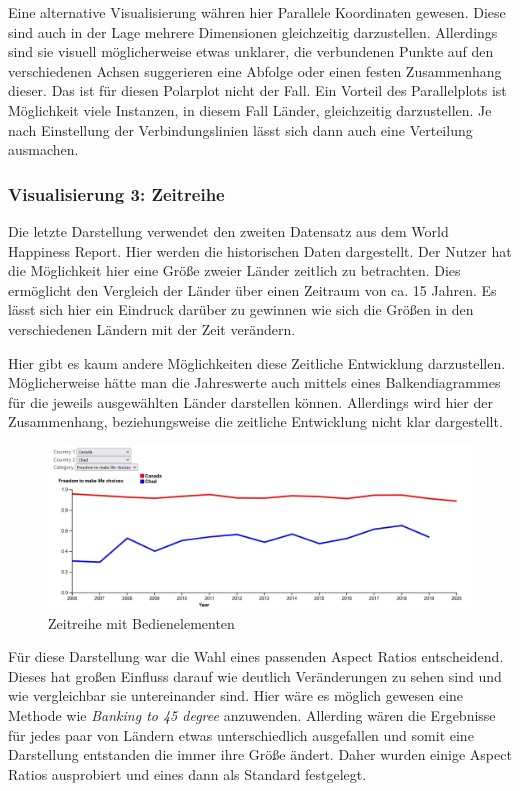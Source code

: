 Eine alternative Visualisierung währen hier Parallele Koordinaten gewesen. Diese sind auch in der Lage mehrere Dimensionen gleichzeitig darzustellen. Allerdings sind sie visuell möglicherweise etwas unklarer, die verbundenen Punkte auf den verschiedenen Achsen suggerieren eine Abfolge oder einen festen Zusammenhang dieser. Das ist für diesen Polarplot nicht der Fall. Ein Vorteil des Parallelplots ist Möglichkeit viele Instanzen, in diesem Fall Länder, gleichzeitig darzustellen. Je nach Einstellung der Verbindungslinien lässt sich dann auch eine Verteilung ausmachen. 

\subsubsection{Visualisierung 3: Zeitreihe}

Die letzte Darstellung verwendet den zweiten Datensatz aus dem World Happiness Report. Hier werden die historischen Daten dargestellt. Der Nutzer hat die Möglichkeit hier eine Größe zweier Länder zeitlich zu betrachten. Dies ermöglicht den Vergleich der Länder über einen Zeitraum von ca. 15 Jahren. Es lässt sich hier ein Eindruck darüber zu gewinnen wie sich die Größen in den verschiedenen Ländern mit der Zeit verändern. 

Hier gibt es kaum andere Möglichkeiten diese Zeitliche Entwicklung darzustellen. Möglicherweise hätte man die Jahreswerte auch mittels eines Balkendiagrammes für die jeweils ausgewählten Länder darstellen können. Allerdings wird hier der Zusammenhang, beziehungsweise die zeitliche Entwicklung nicht klar dargestellt. \\

\begin{figure}[h]
 \centering
 \includegraphics[width = \textwidth]{img/timeseries.jpg}
 \caption{Zeitreihe mit Bedienelementen}
 \label{fig:timeseries}
\end{figure}

Für diese Darstellung war die Wahl eines passenden Aspect Ratios entscheidend. Dieses hat großen Einfluss darauf wie deutlich Veränderungen zu sehen sind und wie vergleichbar sie untereinander sind. Hier wäre es möglich gewesen eine  Methode wie \textit{Banking to 45 degree} anzuwenden. Allerding wären die Ergebnisse für jedes paar von Ländern etwas unterschiedlich ausgefallen und somit eine Darstellung entstanden die immer ihre Größe ändert. Daher wurden einige Aspect Ratios ausprobiert und eines dann als Standard festgelegt.\\

